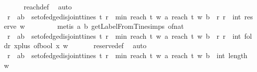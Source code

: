 \begin{isabellebody}
\ \ \ \ \isamarkupfalse%
\ reach{\isacharunderscore}def\ \isamarkupfalse%
\ auto\isanewline
\ \ \isamarkupfalse%
\ {\isachardoublequoteopen}{\isacharbraceleft}r{\isachardot}\ {\isasymexists}\ {\isacharparenleft}a{\isacharcomma}b{\isacharparenright}\ {\isasymin}\ set{\isacharunderscore}of{\isacharunderscore}edge{\isacharunderscore}disjoint{\isacharunderscore}tines\ t{\isachardot}\ r\ {\isacharequal}\ min\ {\isacharparenleft}reach\ t\ w\ a{\isacharparenright}\ {\isacharparenleft}reach\ t\ w\ b{\isacharparenright}{\isacharbraceright}\ {\isacharequal}\ {\isacharbraceleft}r{\isachardot}\ r\ {\isacharequal}\ int\ {\isacharparenleft}reserve\ w\ {\isacharbrackleft}{\isacharbrackright}{\isacharparenright}\ {\isacharminus}\ {}{\isacharbraceright}{\isachardoublequoteclose}\isanewline
\ \ \ \ \isamarkupfalse%
\ {\isacharparenleft}metis\ a\ b\ getLabelFromTine{\isachardot}simps{\isacharparenleft}{}{\isacharparenright}\ of{\isacharunderscore}nat{\isacharunderscore}{}{\isacharparenright}\isanewline
\ \ \isamarkupfalse%
\ {\isachardoublequoteopen}{\isacharbraceleft}r{\isachardot}\ {\isasymexists}\ {\isacharparenleft}a{\isacharcomma}b{\isacharparenright}\ {\isasymin}\ set{\isacharunderscore}of{\isacharunderscore}edge{\isacharunderscore}disjoint{\isacharunderscore}tines\ t{\isachardot}\ r\ {\isacharequal}\ min\ {\isacharparenleft}reach\ t\ w\ a{\isacharparenright}\ {\isacharparenleft}reach\ t\ w\ b{\isacharparenright}{\isacharbraceright}\ {\isacharequal}\ {\isacharbraceleft}r{\isachardot}\ r\ {\isacharequal}\ int\ {\isacharparenleft}foldr\ {\isacharparenleft}{\isasymlambda}x{\isachardot}{\isacharparenleft}plus\ {\isacharparenleft}of{\isacharunderscore}bool\ x{\isacharparenright}{\isacharparenright}{\isacharparenright}\ w\ {}{\isacharparenright}{\isacharbraceright}{\isachardoublequoteclose}\isanewline
\ \ \ \ \isamarkupfalse%
\ reserve{\isacharunderscore}def\ \isamarkupfalse%
\ auto\isanewline
\ \ \isamarkupfalse%
\ {\isachardoublequoteopen}{\isacharbraceleft}r{\isachardot}\ {\isasymexists}\ {\isacharparenleft}a{\isacharcomma}b{\isacharparenright}\ {\isasymin}\ set{\isacharunderscore}of{\isacharunderscore}edge{\isacharunderscore}disjoint{\isacharunderscore}tines\ t{\isachardot}\ r\ {\isacharequal}\ min\ {\isacharparenleft}reach\ t\ w\ a{\isacharparenright}\ {\isacharparenleft}reach\ t\ w\ b{\isacharparenright}{\isacharbraceright}\ {\isacharequal}\ {\isacharbraceleft}int\ {\isacharparenleft}length\ w{\isacharparenright}{\isacharbraceright}{\isachardoublequoteclose}\isanewline

\end{isabellebody}
